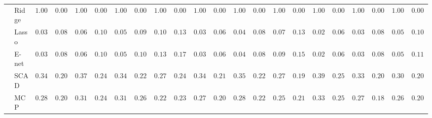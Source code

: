 \begin{tabular}{ll|ll|llllll|llllll|llllll}
 & Ridge  & $1.0000$ & $0.0000$ & $1.0000$ & $0.0000$ & $1.0000$ & $0.0000$ & $1.0000$ & $0.0000$ & $1.0000$ & $0.0000$ & $1.0000$ & $0.0000$ & $1.0000$ & $0.0000$ & $1.0000$ & $0.0000$ & $1.0000$ & $0.0000$ & $1.0000$ & $0.0000$ \\
 & Lasso  & $0.0383$ & $0.0849$ & $0.0633$ & $0.1054$ & $0.0533$ & $0.0944$ & $0.1017$ & $0.1399$ & $0.0317$ & $0.0699$ & $0.0450$ & $0.0849$ & $0.0733$ & $0.1304$ & $0.0250$ & $0.0643$ & $0.0350$ & $0.0831$ & $0.0500$ & $0.1019$ \\
 & E-net  & $0.0383$ & $0.0849$ & $0.0600$ & $0.1047$ & $0.0567$ & $0.1039$ & $0.1350$ & $0.1799$ & $0.0317$ & $0.0699$ & $0.0450$ & $0.0882$ & $0.0917$ & $0.1542$ & $0.0250$ & $0.0643$ & $0.0350$ & $0.0831$ & $0.0583$ & $0.1170$ \\
 & SCAD  & $0.3417$ & $0.2070$ & $0.3717$ & $0.2414$ & $0.3483$ & $0.2273$ & $0.2717$ & $0.2400$ & $0.3400$ & $0.2170$ & $0.3500$ & $0.2254$ & $0.2767$ & $0.1957$ & $0.3933$ & $0.2502$ & $0.3300$ & $0.2024$ & $0.3033$ & $0.2084$ \\
 & MCP  & $0.2817$ & $0.2006$ & $0.3167$ & $0.2422$ & $0.3117$ & $0.2602$ & $0.2250$ & $0.2373$ & $0.2750$ & $0.2057$ & $0.2883$ & $0.2246$ & $0.2567$ & $0.2177$ & $0.3367$ & $0.2518$ & $0.2750$ & $0.1841$ & $0.2650$ & $0.2025$ \\
\hline 
\end{tabular}

